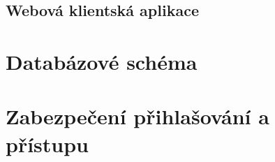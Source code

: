 \subsection{Webová klientská aplikace}



\section{Databázové schéma} \label{db_schema}

\section{Zabezpečení přihlašování a přístupu} \label{db_schema}

